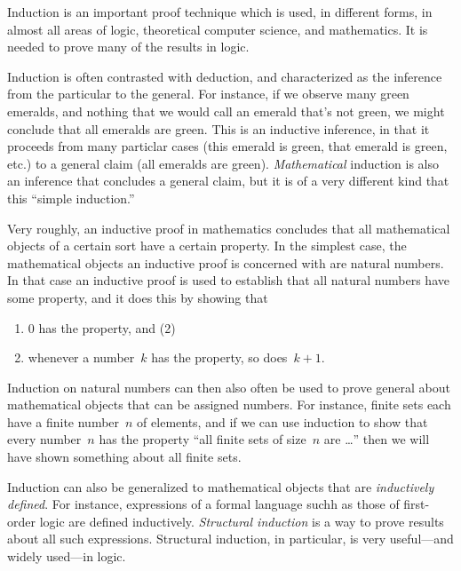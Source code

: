 \documentclass[../../../include/open-logic-section]{subfiles}
\begin{document}


Induction is an important proof technique which is used, in different
forms, in almost all areas of logic, theoretical computer science, and
mathematics.  It is needed to prove many of the results in logic.

Induction is often contrasted with deduction, and characterized as the
inference from the particular to the general.  For instance, if we
observe many green emeralds, and nothing that we would call an emerald
that's not green, we might conclude that all emeralds are green. This
is an inductive inference, in that it proceeds from many particlar
cases (this emerald is green, that emerald is green, etc.) to a
general claim (all emeralds are green).  \emph{Mathematical} induction
is also an inference that concludes a general claim, but it is of a
very different kind that this ``simple induction.''

Very roughly, an inductive proof in mathematics concludes that all
mathematical objects of a certain sort have a certain property.  In
the simplest case, the mathematical objects an inductive proof is
concerned with are natural numbers.  In that case an inductive proof
is used to establish that all natural numbers have some property, and
it does this by showing that
\begin{enumerate}
    \item $0$ has the property, and (2)
    \item whenever a number~$k$ has the property, so does~$k+1$.
\end{enumerate}
Induction on natural numbers can then also often be used to prove
general about mathematical objects that can be assigned numbers. For
instance, finite sets each have a finite number~$n$ of elements, and
if we can use induction to show that every number~$n$ has the property
``all finite sets of size~$n$ are \dots'' then we will have shown
something about all finite sets.

Induction can also be generalized to mathematical objects that are
\emph{inductively defined}.  For instance, expressions of a formal
language suchh as those of first-order logic are defined inductively.
\emph{Structural induction} is a way to prove results about all such
expressions.  Structural induction, in particular, is very
useful---and widely used---in logic.
\end{document}

